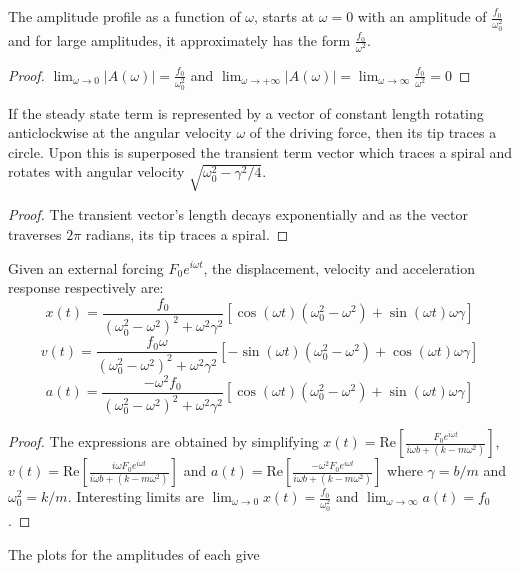 \documentclass[a4paper]{article}
\begin{document}
\begin{cor}
The amplitude profile as a function of $\omega$, starts at $\omega=0$ with an amplitude of $\frac{f_0}{\omega_0^2}$ and for large amplitudes, it approximately has the form $\frac{f_0}{\omega^2}$.
\end{cor}
\begin{proof}
$\lim_{\omega\rightarrow0}|A(\omega)|=\frac{f_0}{\omega_0^2}$ and $\lim_{\omega\rightarrow+\infty}|A(\omega)|=\lim_{\omega\rightarrow\infty}\frac{f_0}{\omega^2}=0$
\end{proof}
\begin{cor}
If the steady state term is represented by a vector of constant length rotating anticlockwise at the angular velocity $\omega$ of the driving force, then its tip traces a circle. Upon this is superposed the transient term vector which traces a spiral and rotates with angular velocity $\sqrt{\omega_0^2-\gamma^2/4}$.
\end{cor}
\begin{proof}
The transient vector's length decays exponentially and as the vector traverses $2\pi$ radians, its tip traces a spiral.
\end{proof}
\begin{cor}
Given an external forcing $F_0e^{i\omega t}$, the displacement, velocity and acceleration response respectively are:
$$x(t)=\frac{f_0}{(\omega_0^2-\omega^2)^2+\omega^2\gamma^2}[\cos(\omega t)(\omega_0^2-\omega^2)+\sin(\omega t)\omega \gamma]$$
$$v(t)=\frac{f_0\omega}{(\omega_0^2-\omega^2)^2+\omega^2\gamma^2}[-\sin(\omega t)(\omega_0^2-\omega^2)+\cos(\omega t)\omega \gamma]$$
$$a(t)=\frac{-\omega^2f_0}{(\omega_0^2-\omega^2)^2+\omega^2\gamma^2}[\cos(\omega t)(\omega_0^2-\omega^2)+\sin(\omega t)\omega\gamma]$$
\end{cor}
\begin{proof}
The expressions are obtained by simplifying $x(t)=\text{Re}[\frac{F_0e^{i\omega t}}{i\omega b+(k-m\omega^2)}]$, $v(t)=\text{Re}[\frac{i\omega F_0e^{i\omega t}}{i\omega b+(k-m\omega^2)}]$ and $a(t)=\text{Re}[\frac{-\omega^2 F_0e^{i\omega t}}{i\omega b+(k-m\omega^2)}]$ where $\gamma=b/m$ and $\omega_0^2=k/m$. Interesting limits are $\lim_{\omega\rightarrow0}x(t)=\frac{f_0}{\omega_0^2}$ and $\lim_{\omega\rightarrow\infty}a(t)=f_0$.
\end{proof}
The plots for the amplitudes of each give
\end{document}
